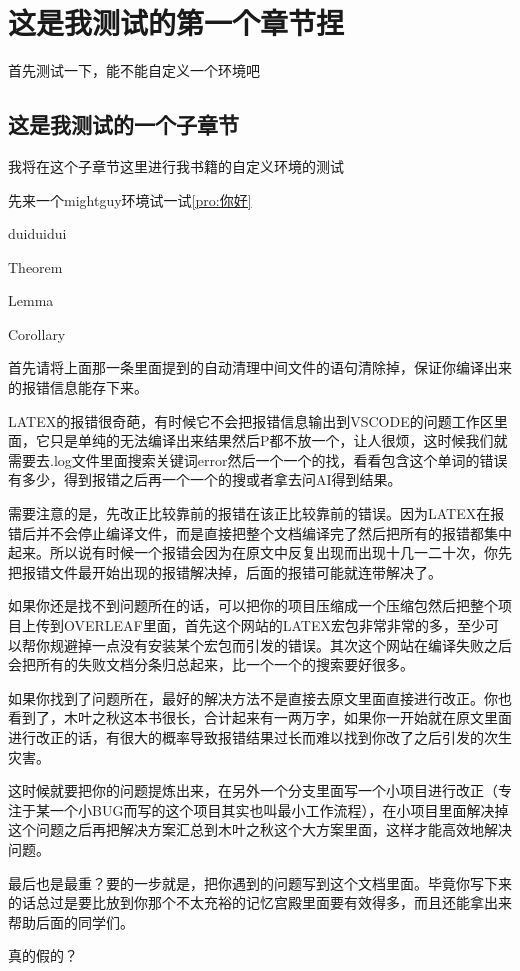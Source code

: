 \documentclass[lang=cn,10pt]{elegantbook}
\begin{document}
\tableofcontents

\chapter{这是我测试的第一个章节捏}
首先测试一下，能不能自定义一个环境吧~

\section{这是我测试的一个子章节}

我将在这个子章节这里进行我书籍的自定义环境的测试

先来一个mightguy环境试一试\ref{pro:你好}

\begin{proposition}\label{pro:你好}
    duiduidui
\end{proposition}

\begin{theorem}
    Theorem
\end{theorem}

\begin{lemma}
    Lemma
\end{lemma}

\begin{corollary}
    Corollary
\end{corollary}
\begin{mightguy}
    首先请将上面那一条里面提到的自动清理中间文件的语句清除掉，保证你编译出来的报错信息能存下来。

    LATEX的报错很奇葩，有时候它不会把报错信息输出到VSCODE的问题工作区里面，它只是单纯的无法编译出来结果然后P都不放一个，让人很烦，这时候我们就需要去.log文件里面搜索关键词error然后一个一个的找，看看包含这个单词的错误有多少，得到报错之后再一个一个的搜或者拿去问AI得到结果。

    需要注意的是，先改正比较靠前的报错在该正比较靠前的错误。因为LATEX在报错后并不会停止编译文件，而是直接把整个文档编译完了然后把所有的报错都集中起来。所以说有时候一个报错会因为在原文中反复出现而出现十几一二十次，你先把报错文件最开始出现的报错解决掉，后面的报错可能就连带解决了。

    如果你还是找不到问题所在的话，可以把你的项目压缩成一个压缩包然后把整个项目上传到OVERLEAF里面，首先这个网站的LATEX宏包非常非常的多，至少可以帮你规避掉一点没有安装某个宏包而引发的错误。其次这个网站在编译失败之后会把所有的失败文档分条归总起来，比一个一个的搜索要好很多。

    如果你找到了问题所在，最好的解决方法不是直接去原文里面直接进行改正。你也看到了，木叶之秋这本书很长，合计起来有一两万字，如果你一开始就在原文里面进行改正的话，有很大的概率导致报错结果过长而难以找到你改了之后引发的次生灾害。

    这时候就要把你的问题提炼出来，在另外一个分支里面写一个小项目进行改正（专注于某一个小BUG而写的这个项目其实也叫最小工作流程），在小项目里面解决掉这个问题之后再把解决方案汇总到木叶之秋这个大方案里面，这样才能高效地解决问题。

    最后也是最重？要的一步就是，把你遇到的问题写到这个文档里面。毕竟你写下来的话总过是要比放到你那个不太充裕的记忆宫殿里面要有效得多，而且还能拿出来帮助后面的同学们。
\end{mightguy}




\begin{bluespace}
    真的假的？
\end{bluespace}
\end{document}
